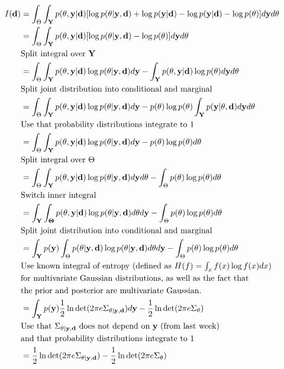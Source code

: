 \begin{align*}
  I(\mathbf{d}) &= \int_{\Theta}\int_{\mathbf{Y}}p(\mathbf{\theta}, \mathbf{y}|\mathbf{d})[\log p(\mathbf{\theta}| \mathbf{y}, \mathbf{d}) + \log p(\mathbf{y}|\mathbf{d}) - \log p(\mathbf{y}|\mathbf{d}) - \log p(\mathbf{\theta})]d\mathbf{y}d\mathbf{\theta}\\
 &= \int_{\Theta}\int_{\mathbf{Y}}p(\mathbf{\theta}, \mathbf{y}|\mathbf{d})[\log p(\mathbf{\theta}| \mathbf{y}, \mathbf{d}) - \log p(\mathbf{\theta})]d\mathbf{y}d\mathbf{\theta}\\
 & \mbox{Split integral over $\mathbf{Y}$}\\
 &= \int_{\Theta}\int_{\mathbf{Y}}p(\mathbf{\theta}, \mathbf{y}|\mathbf{d})\log p(\mathbf{\theta}| \mathbf{y}, \mathbf{d}) d\mathbf{y}- \int_{\mathbf{Y}}p(\mathbf{\theta}, \mathbf{y}|\mathbf{d})\log p(\mathbf{\theta})d\mathbf{y}d\mathbf{\theta}\\
 & \mbox{Split joint distribution into conditional and marginal} \\
&= \int_{\Theta}\int_{\mathbf{Y}}p(\mathbf{\theta}, \mathbf{y}|\mathbf{d})\log p(\mathbf{\theta}| \mathbf{y}, \mathbf{d}) d\mathbf{y}- p(\theta)\log p(\mathbf{\theta})\int_{\mathbf{Y}}p(\mathbf{y}|\mathbf{\theta}, \mathbf{d})d\mathbf{y}d\mathbf{\theta}\\
 & \mbox{Use that probability distributions integrate to 1} \\
&= \int_{\Theta}\int_{\mathbf{Y}}p(\mathbf{\theta}, \mathbf{y}|\mathbf{d})\log p(\mathbf{\theta}| \mathbf{y}, \mathbf{d}) d\mathbf{y}- p(\theta)\log p(\mathbf{\theta})d\mathbf{\theta}\\
  & \mbox{Split integral over $\Theta$} \\
&= \int_{\Theta}\int_{\mathbf{Y}}p(\mathbf{\theta}, \mathbf{y}|\mathbf{d})\log p(\mathbf{\theta}| \mathbf{y}, \mathbf{d}) d\mathbf{y}d\mathbf{\theta}- \int_\Theta p(\theta)\log p(\mathbf{\theta})d\mathbf{\theta}\\
  & \mbox{Switch inner integral} \\
&= \int_{\mathbf{Y}}\int_{\mathbf{\Theta}}p(\mathbf{\theta}, \mathbf{y}|\mathbf{d})\log p(\mathbf{\theta}| \mathbf{y}, \mathbf{d}) d\mathbf{\theta}d\mathbf{y}- \int_\Theta p(\theta)\log p(\mathbf{\theta})d\mathbf{\theta}\\
 & \mbox{Split joint distribution into conditional and marginal} \\
&= \int_{\mathbf{Y}}p(\mathbf{y})\int_{\Theta}p(\mathbf{\theta}|\mathbf{y},\mathbf{d})\log p(\mathbf{\theta}| \mathbf{y}, \mathbf{d}) d\mathbf{\theta}d\mathbf{y}- \int_\Theta p(\theta)\log p(\mathbf{\theta})d\mathbf{\theta}\\
& \mbox{Use known integral of entropy (defined as $H(f) = \int_x f(x)\log f(x) dx$) }\\
& \mbox{for multivariate Gaussian distributions, as well as the fact that }\\
& \mbox{the prior and posterior are multivariate Gaussian.} \\
&= \int_{\mathbf{Y}}p(\mathbf{y})\frac{1}{2}\ln \det (2\pi e \Sigma_{\theta|\mathbf{y,d}})d\mathbf{y}- \frac{1}{2}\ln \det (2\pi e\Sigma_\theta)\\
& \mbox{Use that $\Sigma_{\theta | \mathbf{y, d}}$ does not depend on $\mathbf{y}$ (from last week)} \\
& \mbox{and that probability distributions integrate to 1} \\
&= \frac{1}{2}\ln \det (2\pi e \Sigma_{\theta|\mathbf{y,d}})- \frac{1}{2}\ln \det (2\pi e\Sigma_\theta)\\
\end{align*}
